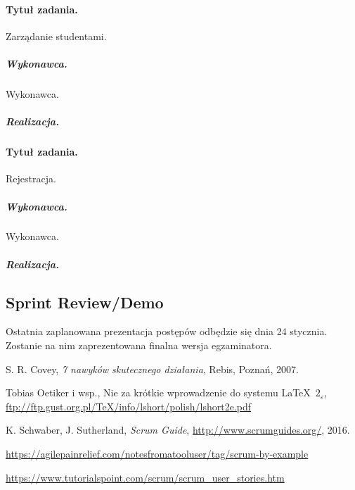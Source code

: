 \documentclass[a4paper]{article}
\begin{document}
\paragraph{Tytuł zadania.} Zarządanie studentami.
\subparagraph{Wykonawca.} Wykonawca.
\subparagraph{Realizacja.} 

\paragraph{Tytuł zadania.} Rejestracja.
\subparagraph{Wykonawca.} Wykonawca.
\subparagraph{Realizacja.} 

\subsection{Sprint Review/Demo}
Ostatnia zaplanowana prezentacja postępów odbędzie się dnia 24 stycznia. Zostanie na nim zaprezentowana finalna wersja egzaminatora. 





\begin{thebibliography}{9}

 S. R. Covey, {\em 7 nawyków skutecznego działania}, Rebis, Poznań, 2007.

 Tobias Oetiker i wsp., Nie za krótkie wprowadzenie do systemu \LaTeX  \ $2_\varepsilon$, \url{ftp://ftp.gust.org.pl/TeX/info/lshort/polish/lshort2e.pdf}

 K. Schwaber, J. Sutherland, {\em Scrum Guide}, \url{http://www.scrumguides.org/}, 2016.

 \url{https://agilepainrelief.com/notesfromatooluser/tag/scrum-by-example}

 \url{https://www.tutorialspoint.com/scrum/scrum_user_stories.htm}

\end{thebibliography}
\end{document}

